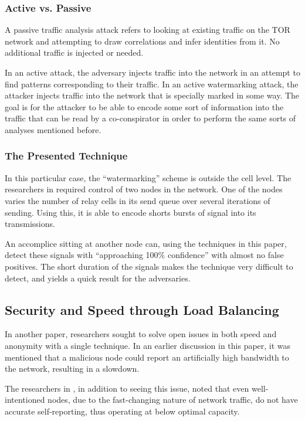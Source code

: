 \documentclass[letterpaper, titlepage, 12pt]{article}
\begin{document}
\subsubsection{Active vs. Passive}
A passive traffic analysis attack refers to looking at existing traffic on the TOR network and attempting to draw correlations and infer identities from it. No additional traffic is injected or needed. 

In an active attack, the adversary injects traffic into the network in an attempt to find patterns corresponding to their traffic. In an active watermarking attack, the attacker injects traffic into the network that is specially marked in some way. The goal is for the attacker to be able to encode some sort of information into the traffic that can be read by a co-conspirator in order to perform the same sorts of analyses mentioned before.

\subsubsection{The Presented Technique}
In this particular case, the ``watermarking'' scheme is outside the cell level. The researchers in \cite{6132443} required control of two nodes in the network. One of the nodes varies the number of relay cells in its send queue over several iterations of sending. Using this, it is able to encode shorts bursts of signal into its transmissions.

An accomplice sitting at another node can, using the techniques in this paper, detect these signals with ``approaching 100\% confidence''\cite{6132443} with almost no false positives. The short duration of the signals makes the technique very difficult to detect, and yields a quick result for the adversaries.

\subsection{Security and Speed through Load Balancing}

In another paper, researchers sought to solve open issues in both speed and anonymity with a single technique. In an earlier discussion in this paper, it was mentioned that a malicious node could report an artificially high bandwidth to the network, resulting in a slowdown.

The researchers in \cite{5560675}, in addition to seeing this issue, noted that even well-intentioned nodes, due to the fast-changing nature of network traffic, do not have accurate self-reporting, thus operating at below optimal capacity.
\end{document}
